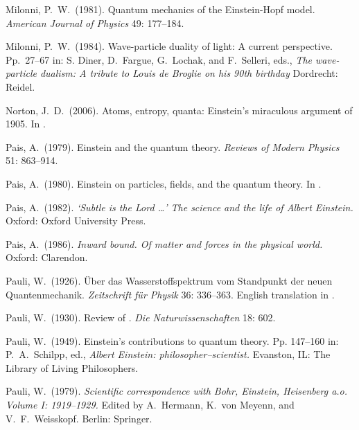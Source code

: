 \documentclass[12pt]{elsart}
\begin{document}
{\begin{thebibliography}{}
  Milonni, P.\ W.\ (1981). Quantum mechanics of the Einstein-Hopf model. {\it American Journal of Physics} 49: 177--184.

  Milonni, P.\ W.\ (1984). Wave-particle duality of light: A current perspective. Pp.\ 27--67 in:  S. Diner, D.\ Fargue, G.\ Lochak, and F.\ Selleri, eds., {\it The wave-particle dualism: A tribute to Louis de Broglie on his 90th birthday} Dordrecht: Reidel.

 Norton, J.\ D.\ (2006). Atoms, entropy, quanta: Einstein's miraculous argument of 1905. In \citep[71--100]{Janssen 2006}.


 Pais, A.\ (1979). Einstein and the quantum theory. {\it Reviews of Modern Physics} 51: 863--914.

 Pais, A.\ (1980). Einstein on particles, fields, and the quantum theory. In \citep[pp.\ 197--251]{Woolf 1980}.

 Pais, A.\ (1982). {\it `Subtle is the Lord \ldots' The science and the life of Albert Einstein.} Oxford: Oxford University Press.

 Pais, A.\ (1986). {\it Inward bound. Of matter and forces in the physical world.} Oxford: Clarendon.

 Pauli, W.\ (1926). \"Uber das Wasserstoffspektrum vom Standpunkt der neuen Quantenmechanik.  {\it Zeitschrift f\"ur Physik} 36: 336--363. English translation in \citep[pp.\ 387--415]{Van der Waerden}.

 Pauli, W.\ (1930). Review of \citep{Born and Jordan 1930}. {\it Die Naturwissenschaften} 18: 602.

 Pauli, W.\ (1949). Einstein's contributions to quantum theory. Pp. 147--160 in: P.\ A.\ Schilpp, ed., {\it Albert Einstein: philosopher--scientist.} Evanston, IL: The Library of Living Philosophers.

 Pauli, W.\ (1979). {\it Scientific correspondence with Bohr, Einstein, Heisenberg a.o. Volume I: 1919--1929.} Edited by A.\ Hermann, K.\ von Meyenn, and  V.\ F.\ Weisskopf. Berlin: Springer.


\end{thebibliography}}
\end{document}
